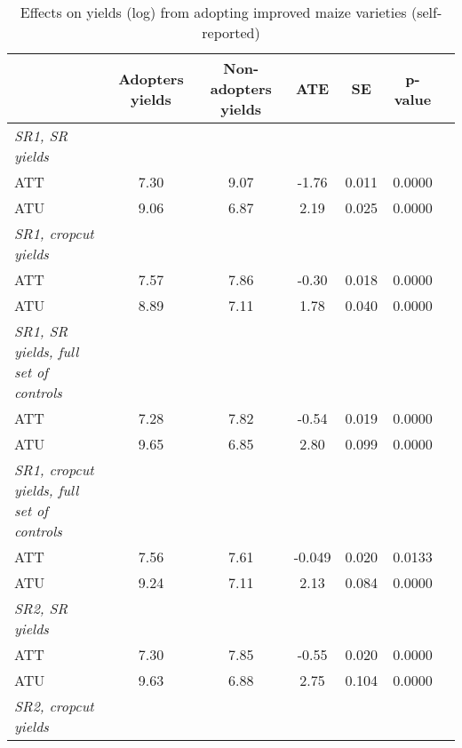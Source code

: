 \begin{table}[htbp]
\centering
\hspace*{-1.2cm}
\begin{threeparttable}
\caption{Effects on yields (log) from adopting improved maize varieties (self-reported)}
\label{tab:switching}
\begin{tabular}{l cccccc}
\hline
\hline
            &Adopters yields&Non-adopters yields&        ATE&          SE&     p-value\\
\hline
\textit{SR1, SR yields}&            &            &            &            &            \\
ATT         &        7.30&        9.07&       -1.76&       0.011&      0.0000\\
%
%
%
ATU         &        9.06&        6.87&        2.19&       0.025&      0.0000\\
%
%
%
\textit{SR1, cropcut yields}&            &            &            &            &            \\
ATT         &        7.57&        7.86&       -0.30&       0.018&      0.0000\\
%
%
%
ATU         &        8.89&        7.11&        1.78&       0.040&      0.0000\\
%
%
%
\textit{SR1, SR yields, full set of controls}&            &            &            &            &            \\
ATT         &        7.28&        7.82&       -0.54&       0.019&      0.0000\\
%
%
%
ATU         &        9.65&        6.85&        2.80&       0.099&      0.0000\\
%
%
%
\textit{SR1, cropcut yields, full set of controls}&            &            &            &            &            \\
ATT         &        7.56&        7.61&      -0.049&       0.020&      0.0133\\
%
%
%
ATU         &        9.24&        7.11&        2.13&       0.084&      0.0000\\
%
%
%
\textit{SR2, SR yields}&            &            &            &            &            \\
ATT         &        7.30&        7.85&       -0.55&       0.020&      0.0000\\
%
%
%
ATU         &        9.63&        6.88&        2.75&       0.104&      0.0000\\
%
%
%
\textit{SR2, cropcut yields}&            &            &            &            &            \\

\end{tabular}
\end{threeparttable}
\end{table}
